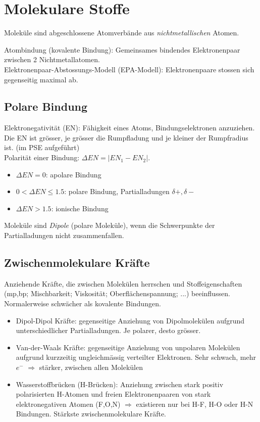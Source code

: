 \section{Molekulare Stoffe}
Moleküle sind abgeschlossene Atomverbände aus \emph{nichtmetallischen} Atomen. 

Atombindung (kovalente Bindung): Gemeinsames bindendes Elektronenpaar zwischen 2 Nichtmetallatomen. \\

Elektronenpaar-Abstossungs-Modell (EPA-Modell): Elektronenpaare stossen sich gegenseitig maximal ab. \\

\subsection{Polare Bindung}
Elektronegativität (EN): Fähigkeit eines Atoms, Bindungselektronen anzuziehen. Die EN ist grösser, je grösser die Rumpfladung und je kleiner der Rumpfradius ist. (im PSE aufgeführt) \\

Polarität einer Bindung: $\Delta EN = | EN_{1} - EN_{2} |$. 
\begin{itemize}
	\item $\Delta EN = 0$: apolare Bindung
	\item $0 < \Delta EN  \leq 1.5$: polare Bindung, Partialladungen $\delta+, \delta-$
	\item $\Delta EN > 1.5$: ionische Bindung
\end{itemize}

Moleküle sind \emph{Dipole} (polare Moleküle), wenn die Schwerpunkte der Partialladungen nicht zusammenfallen. 

\subsection{Zwischenmolekulare Kräfte}
Anziehende Kräfte, die zwischen Molekülen herrschen und Stoffeigenschaften (mp,bp; Mischbarkeit; Viskosität; Oberflächenspannung; ...) beeinflussen. Normalerweise schwächer als kovalente Bindungen.

\begin{itemize}
	\item Dipol-Dipol Kräfte: gegenseitige Anziehung von Dipolmolekülen aufgrund unterschiedlicher Partialladungen. Je polarer, desto grösser.
	\item Van-der-Waals Kräfte: gegenseitige Anziehung von unpolaren Molekülen aufgrund kurzzeitig ungleichmässig verteilter Elektronen. Sehr schwach, mehr $e^-$ $\Rightarrow$ stärker, zwischen allen Molekülen
	\item Wasserstoffbrücken (H-Brücken): Anziehung zwischen stark positiv polarisierten H-Atomen und freien Elektronenpaaren von stark elektronegativen Atomen (F,O,N) $\Rightarrow$ existieren nur bei H-F, H-O oder H-N Bindungen. Stärkste zwischenmolekulare Kräfte.
\end{itemize}

